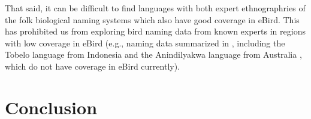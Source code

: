 \documentclass[10pt,letterpaper]{article}
\begin{document}
That said, it can be difficult to find languages with both expert ethnographries of the folk biological naming systems which also have good coverage in eBird. This has prohibited us from exploring bird naming data from known experts in regions with low coverage in eBird (e.g., naming data summarized in \cite{holman2002relation}, including the Tobelo language from Indonesia \cite{taylor1990folk} and the Anindilyakwa language from Australia \cite{waddy1988classification}, which do not have coverage in eBird currently).


\section{Conclusion}








\end{document}
